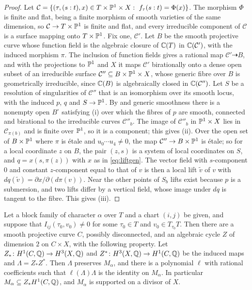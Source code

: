 \begin{proof}
Let $\mathcal C=\{(\tau,(s:t),x)\in T\times\mathbb{P}^{1}\times X:\ f_{\tau}(s:t)=
\Phi(x)\}$. The morphism $\Phi$ is finite and flat, being a finite morphism
of smooth varieties of the same dimension, so $\mathcal C\to T\times\mathbb{P}^{1}$
is finite and flat, and every irreducible component of $\mathcal C$ is a
surface mapping onto $T\times\mathbb{P}^{1}$. Fix one, $\mathcal C'$. Let $B$ be
the smooth projective curve whose function field is the algebraic closure of
$\mathbb{C}(T)$ in $\mathbb{C}(\mathcal C')$, with the induced morphism $\pi$. The
inclusion of function fields gives a rational map $\mathcal C'
\dashrightarrow B$, and with the projections to $\mathbb{P}^{1}$ and $X$ it maps
$\mathcal C'$ birationally onto a dense open subset of an irreducible
surface $\mathcal C''\subseteq B\times\mathbb{P}^{1}\times X$, whose generic fibre
over $B$ is geometrically irreducible, since $\mathbb{C}(B)$ is algebraically closed
in $\mathbb{C}(\mathcal C'')$. Let $S$ be a resolution of singularities of
$\mathcal C''$ that is an isomorphism over its smooth locus, with the
induced $p$, $q$ and $S\to\mathbb{P}^{1}$. By \cite[9.7.7]{EGA43} and generic
smoothness \cite[III.10.7]{Har77} there is a nonempty open $B^{\circ}$
satisfying (i) over which the fibres of $p$ are smooth, connected and
birational to the irreducible curves $\mathcal C''_{b}$. The image of
$\mathcal C''_{b}$ in $\mathbb{P}^{1}\times X$ lies in $\mathcal C_{\pi(b)}$ and is
finite over $\mathbb{P}^{1}$, so it is a component; this gives (ii). Over the open
set of $B\times\mathbb{P}^{1}$ where $\pi$ is \'etale and $u_{0}\cdots u_{4}\ne0$,
the map $\mathcal C''\to B\times\mathbb{P}^{1}$ is \'etale; so for a local
coordinate $z$ on $B$, the pair $(z,s)$ is a system of local coordinates on
$S$, and $q=x(s,\pi(z))$ with $x$ as in \eqref{eq:liftgen}. The vector field
with $s$-component $0$ and constant $z$-component equal to that of $v$ is
then a local lift $\tilde v$ of $v$ with $dq(\tilde v)=\partial x/\partial
(d\pi(v))$. Near the other points of $S_{b}$ lifts exist because $p$ is a
submersion, and two lifts differ by a vertical field, whose image under
$dq$ is tangent to the fibre. This gives (iii).
\end{proof}

\begin{theorem}\label{thm:coniveau}
Let a block family of character $\alpha$ over $T$ and a chart $(i,j)$ be
given, and suppose that $I_{ij}(\tau_{0},v_{0})\ne0$ for some $\tau_{0}\in
T$ and $v_{0}\in T_{\tau_{0}}T$. Then there are a smooth projective curve
$C$, possibly disconnected, and an algebraic cycle $Z$ of dimension $2$ on
$C\times X$, with the following property. Let $Z_{*}\colon H^{1}(C,\mathbb{Q})\to
H^{3}(X,\mathbb{Q})$ and $Z^{*}\colon H^{3}(X,\mathbb{Q})\to H^{1}(C,\mathbb{Q})$ be the induced
maps and $\Lambda=Z_{*}Z^{*}$. Then $\Lambda$ preserves $M_{\alpha}$, and
there is a polynomial $\ell$ with rational coefficients such that
$\ell(\Lambda)\Lambda$ is the identity on $M_{\alpha}$. In particular
$M_{\alpha}\subseteq Z_{*}H^{1}(C,\mathbb{Q})$, and $M_{\alpha}$ is supported on a
divisor of $X$.
\end{theorem}

